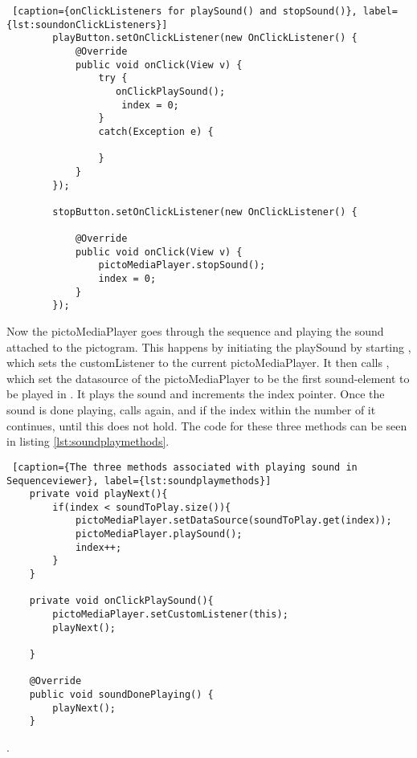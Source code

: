 \begin{lstlisting} [caption={onClickListeners for playSound() and stopSound()}, label={lst:soundonClickListeners}]
        playButton.setOnClickListener(new OnClickListener() {
            @Override
            public void onClick(View v) {
                try {
                   onClickPlaySound();
                    index = 0;
                }
                catch(Exception e) {

                }
            }
        });

        stopButton.setOnClickListener(new OnClickListener() {

            @Override
            public void onClick(View v) {
                pictoMediaPlayer.stopSound();
                index = 0;
            }
        });
\end{lstlisting}

Now the pictoMediaPlayer goes through the sequence and playing the sound attached to the pictogram. This happens by initiating the playSound by starting , which sets the customListener to the current pictoMediaPlayer. It then calls , which set the datasource of the pictoMediaPlayer to be the first sound-element to be played in . It plays the sound and increments the index pointer. Once the sound is done playing,  calls  again, and if the index within the number of  it continues, until this does not hold. The code for these three methods can be seen in listing \ref{lst:soundplaymethods}.

\begin{lstlisting} [caption={The three methods associated with playing sound in Sequenceviewer}, label={lst:soundplaymethods}]
    private void playNext(){
        if(index < soundToPlay.size()){
            pictoMediaPlayer.setDataSource(soundToPlay.get(index));
            pictoMediaPlayer.playSound();
            index++;
        }
    }

    private void onClickPlaySound(){
        pictoMediaPlayer.setCustomListener(this);
        playNext();

    }

    @Override
    public void soundDonePlaying() {
        playNext();
    }
\end{lstlisting}

.
